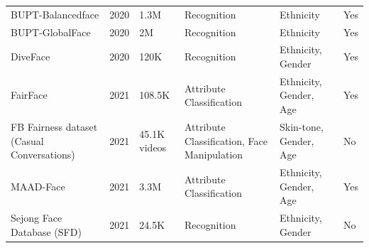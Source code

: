 \documentclass[journal]{IEEEtran}
\begin{document}
\begin{table}[!t]
\begin{tabular}{|p{}|C{0.025\textwidth}|C{0.09\textwidth}|p{0.19\textwidth}|p{0.2\textwidth}|C{0.06\textwidth}|}
BUPT-Balancedface \cite{shi2020pv}                                                      & 2020          & 1.3M                        & Recognition                                                                    & Ethnicity                                           & Yes                    \\
BUPT-GlobalFace \cite{shi2020pv}                                                        & 2020          & 2M                          & Recognition                                                                    & Ethnicity                                           & Yes                    \\
DiveFace \cite{morales2020sensitivenets}                                                & 2020          & 120K                        & Recognition                                                                    & Ethnicity, Gender                                   & Yes                    \\
FairFace \cite{karkkainen2021fairface}                                                  & 2021          & 108.5K                      & Attribute Classification                                                       & Ethnicity, Gender, Age                              & Yes                    \\
FB Fairness dataset (Casual Conversations) \cite{hazirbas2021towards}                   & 2021          & 45.1K videos                & Attribute Classification, Face Manipulation                                    & Skin-tone, Gender, Age                              & No                     \\
MAAD-Face \cite{terhorst2021maad}                                                       & 2021          & 3.3M                        & Attribute Classification                                                       & Ethnicity, Gender, Age                              & Yes                    \\
Sejong Face Database (SFD) \cite{cheema2021sejong}                                      & 2021          & 24.5K                       & Recognition                                                                    & Ethnicity, Gender                                   & No                     \\ \hline
\end{tabular}
\end{table}
\end{document}
